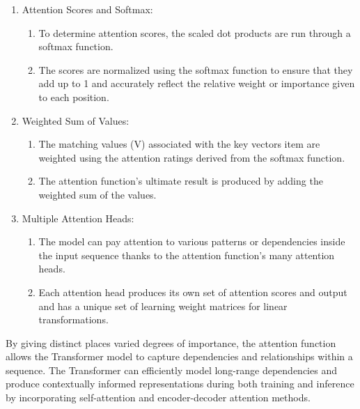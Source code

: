\begin{enumerate}
\begin{enumerate}
    \end{enumerate}

    \item Attention Scores and Softmax:
    \begin{enumerate}
         \item To determine attention scores, the scaled dot products are run through a softmax function.
        \item The scores are normalized using the softmax function to ensure that they add up to 1 and accurately reflect the relative weight or importance given to each position.


    \end{enumerate}

    \item Weighted Sum of Values:
    \begin{enumerate}
       \item The matching values (V) associated with the key vectors item are weighted using the attention ratings derived from the softmax function. 
      \item The attention function's ultimate result is produced by adding the weighted sum of the values.


    \end{enumerate}

    \item Multiple Attention Heads:
    \begin{enumerate}
        \item The model can pay attention to various patterns or dependencies inside the input sequence thanks to the attention function's many attention heads.
        \item Each attention head produces its own set of attention scores and output and has a unique set of learning weight matrices for linear transformations.


    \end{enumerate}
\end{enumerate}

By giving distinct places varied degrees of importance, the attention function allows the Transformer model to capture dependencies and relationships within a sequence. The Transformer can efficiently model long-range dependencies and produce contextually informed representations during both training and inference by incorporating self-attention and encoder-decoder attention methods.


